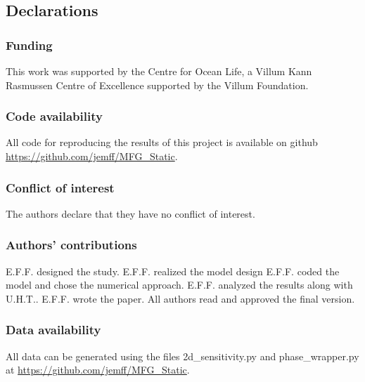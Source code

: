\documentclass[referee,natbib,smallcondensed]{svjour3}     %
\begin{document}
\subsection*{Declarations}

\subsubsection*{Funding}
This work was supported by the Centre for Ocean Life,
a Villum Kann Rasmussen Centre of Excellence supported
by the Villum Foundation.
\subsubsection*{Code availability}
All code for reproducing the results of this project is available on github \url{https://github.com/jemff/MFG_Static}.
\subsubsection*{Conflict of interest}
The authors declare that they have no conflict of interest.
\subsubsection*{Authors' contributions}
E.F.F. designed the study. E.F.F. realized the model design E.F.F. coded the model and chose the numerical approach. E.F.F. analyzed the results along with U.H.T.. E.F.F. wrote the paper. All authors read and approved the final version.
\subsubsection*{Data availability}
All data can be generated using the files 2d\_sensitivity.py and phase\_wrapper.py at \url{https://github.com/jemff/MFG_Static}.

\appendix

%
%
%
\end{document}
